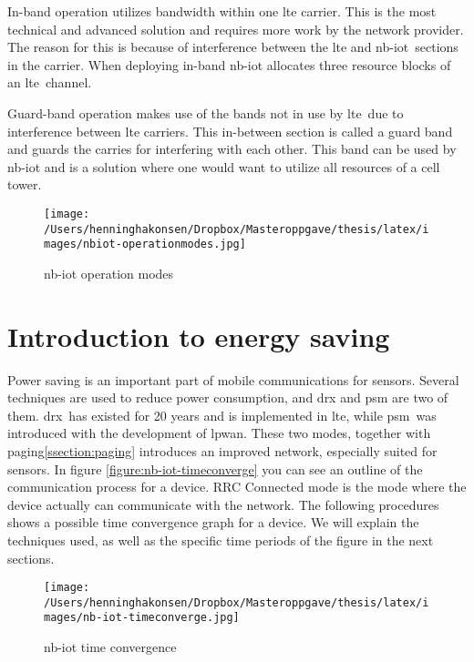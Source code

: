\documentclass[USenglish]{ifimaster}  %
\begin{document}
In-band operation utilizes bandwidth within one \acrshort{lte} carrier. This is the most technical and advanced solution and requires more work by the network provider. The reason for this is because of interference between the \acrshort{lte} and \acrshort{nb-iot} sections in the carrier. When deploying in-band \acrshort{nb-iot} allocates three resource blocks of an \acrshort{lte} channel.

Guard-band operation makes use of the bands not in use by \acrshort{lte} due to interference between \acrshort{lte} carriers. This in-between section is called a guard band and guards the carries for interfering with each other. This band can be used by \acrshort{nb-iot} and is a solution where one would want to utilize all resources of a cell tower.

\begin{figure}[ht]
  \centering\texttt{[image: /Users/henninghakonsen/Dropbox/Masteroppgave/thesis/latex/images/nbiot-operationmodes.jpg]}
  \caption{\acrshort{nb-iot} operation modes \cite{online:legacyWire}}
  \label{figure:nbiot-operationmodes}
\end{figure}

\section{Introduction to energy saving} \label{section:energysaving}
Power saving is an important part of mobile communications for sensors. Several techniques are used to reduce power consumption, and \acrfull{drx} and \acrfull{psm} are two of them. \acrshort{drx} has existed for 20 years and is implemented in \acrshort{lte}, while \acrshort{psm} was introduced with the development of \acrshort{lpwan}. These two modes, together with paging\ref{ssection:paging} introduces an improved network, especially suited for sensors. In figure \vref{figure:nb-iot-timeconverge} you can see an outline of the communication process for a device. RRC Connected mode is the mode where the device actually can communicate with the network. The following procedures shows a possible time convergence graph for a device. We will explain the techniques used, as well as the specific time periods of the figure in the next sections.

\begin{figure}[ht]
  \centering\texttt{[image: /Users/henninghakonsen/Dropbox/Masteroppgave/thesis/latex/images/nb-iot-timeconverge.jpg]}
  \caption{\acrshort{nb-iot} time convergence \cite{person:ola}}
  \label{figure:nb-iot-timeconverge}
\end{figure}
\end{document}
